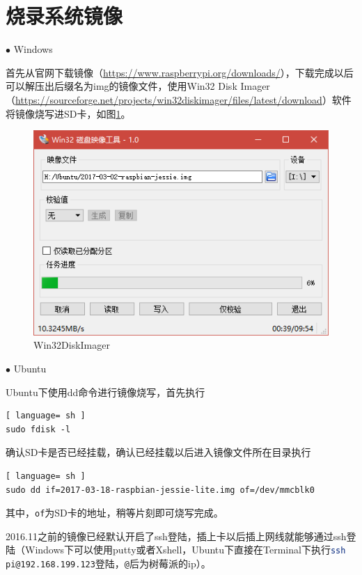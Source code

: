 	\section{烧录系统镜像}
		\par $\bullet$ Windows
		\par 首先从官网下载镜像（\href{https://www.raspberrypi.org/downloads/}{https://www.raspberrypi.org/downloads/}），下载完成以后可以解压出后缀名为img的镜像文件，使用Win32 Disk Imager（\href{https://sourceforge.net/projects/win32diskimager/files/latest/download}{https://sourceforge.net/projects/win32diskimager/files/latest/download}）软件将镜像烧写进SD卡，如图\ref{fig:win32diskimager}。
		\begin{figure}[htp]
			\centering
			\includegraphics[width=13cm]{figures/win32diskimager.png}
			\caption{Win32DiskImager}
			\label{fig:win32diskimager}
		\end{figure}
		\par $\bullet$ Ubuntu
		\par Ubuntu下使用dd命令进行镜像烧写，首先执行
		\begin{lstlisting}[ language= sh ]
sudo fdisk -l
		\end{lstlisting}
		\par 确认SD卡是否已经挂载，确认已经挂载以后进入镜像文件所在目录执行
		\begin{lstlisting}[ language= sh ]
sudo dd if=2017-03-18-raspbian-jessie-lite.img of=/dev/mmcblk0
		\end{lstlisting}
		\par 其中，\lstinline[language=sh]{of}为SD卡的地址，稍等片刻即可烧写完成。
		\par 2016.11之前的镜像已经默认开启了ssh登陆，插上卡以后插上网线就能够通过ssh登陆（Windows下可以使用putty或者Xshell，Ubuntu下直接在Terminal下执行\lstinline[language=sh]{ssh pi@192.168.199.123}登陆，\lstinline[language=sh]{@}后为树莓派的ip）。
